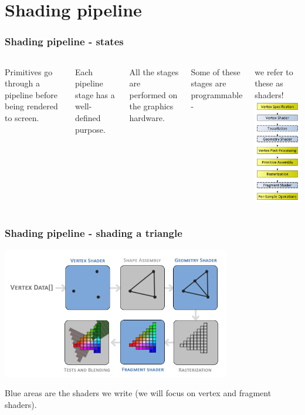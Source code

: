 \documentclass{beamer}
\begin{document}
%
%
%
\section{Shading pipeline}

\begin{frame}
\frametitle{Shading pipeline - states}
\begin{columns}
Primitives go through a pipeline before being rendered to screen.

\vspace{3mm}
Each pipeline stage has a well-defined purpose.

\vspace{3mm}
All the stages are performed on the graphics hardware.

\vspace{3mm}
Some of these stages are programmable -

\vspace{1mm}
we refer to these as shaders!
\includegraphics[width=36mm]{images/RenderingPipeline.png}
\end{columns}
\end{frame}

\begin{frame}
\frametitle{Shading pipeline - shading a triangle}
\includegraphics[width=10cm]{images/pipeline.png}

Blue areas are the shaders we write
(we will focus on vertex and fragment shaders).
\end{frame}
\end{document}
